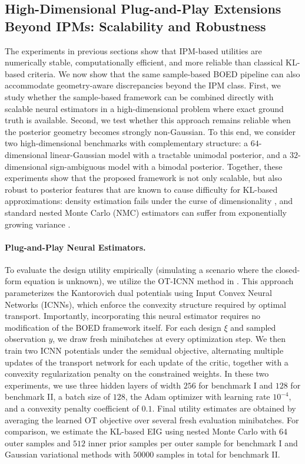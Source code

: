 \documentclass[twoside,11pt]{article}
\begin{document}
\subsection{High-Dimensional Plug-and-Play Extensions Beyond IPMs: Scalability and Robustness}
\label{sec:highd_exp}
The experiments in previous sections show that IPM-based utilities are numerically stable, computationally efficient, and more reliable than classical KL-based criteria. We now show that the same sample-based BOED pipeline can also accommodate geometry-aware discrepancies beyond the IPM class. First, we study whether the sample-based framework can be combined directly with scalable neural estimators in a high-dimensional problem where exact ground truth is available. Second, we test whether this approach remains reliable when the posterior geometry becomes strongly non-Gaussian. To this end, we consider two high-dimensional benchmarks with complementary structure: a $64$-dimensional linear-Gaussian model with a tractable unimodal posterior, and a $32$-dimensional sign-ambiguous model with a bimodal posterior. Together, these experiments show that the proposed framework is not only scalable, but also robust to posterior features that are known to cause difficulty for KL-based approximations: density estimation fails under the curse of dimensionality \citep{li2024expected}, and standard nested Monte Carlo (NMC) estimators can suffer from exponentially growing variance \citep{foster2019variational}.

\paragraph{Plug-and-Play Neural Estimators.} To evaluate the design utility empirically (simulating a scenario where the closed-form equation is unknown), we utilize the OT-ICNN method in \citet{makkuva2020optimal}. This approach parameterizes the Kantorovich dual potentials using Input Convex Neural Networks (ICNNs), which enforce the convexity structure required by optimal transport. Importantly, incorporating this neural estimator requires no modification of the BOED framework itself. For each design $\xi$ and sampled observation $y$, we draw fresh minibatches at every optimization step. We then train two ICNN potentials under the semidual objective, alternating multiple updates of the transport network for each update of the critic, together with a convexity regularization penalty on the constrained weights. In these two experiments, we use three hidden layers of width $256$ for benchmark I and $128$ for benchmark II, a batch size of $128$, the Adam optimizer with learning rate $10^{-4}$, and a convexity penalty coefficient of $0.1$. Final utility estimates are obtained by averaging the learned OT objective over several fresh evaluation minibatches. For comparison, we estimate the KL-based EIG using nested Monte Carlo with $64$ outer samples and $512$ inner prior samples per outer sample for benchmark I and Gaussian variational methods with $50000$ samples in total for benchmark II.
\end{document}

